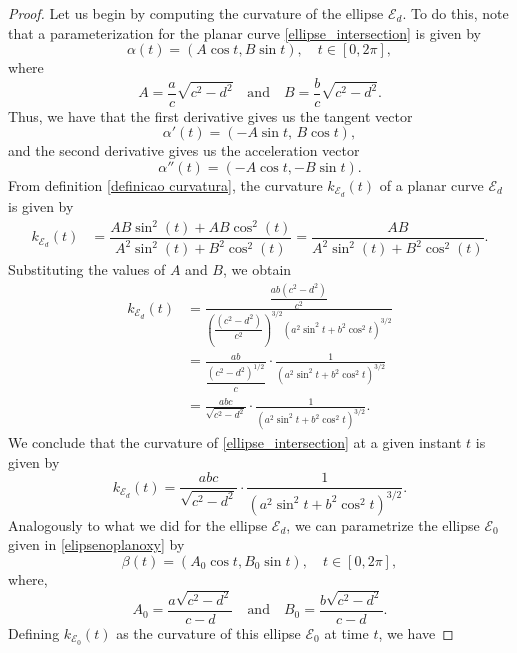 \documentclass[10pt,a4paper]{amsart}
\begin{document}
\begin{proof}
	Let us begin by computing the curvature of the ellipse \( \mathcal{E}_d \). To do this, note that a parameterization for the planar curve  \eqref{ellipse_intersection} is given by
	\begin{equation}\label{parametriza elipse ed}
		\alpha(t) = (A \cos t, B \sin t), \quad t \in [0,2\pi],
	\end{equation}
	where
	$$
	A = \dfrac{a}{c}\sqrt{c^2 - d^2} \quad \text{and} \quad B = \dfrac{b}{c}\sqrt{c^2 - d^2}.
	$$
	Thus, we have that the first derivative gives us the tangent vector
	$$
	\alpha'(t) = (-A \sin t,\, B \cos t),
	$$
	and the second derivative gives us the acceleration vector
	$$
	\alpha''(t) = (-A \cos t, -B \sin t).
	$$
	From definition \ref{definicao curvatura}, the curvature $k_{\mathcal{E}_d}(t)$ of a planar curve $\mathcal{E}_d$ is given by
	\begin{align*}
		k_{\mathcal{E}_d}(t) & = \dfrac{AB \sin^2(t) + AB \cos^2(t)}{A^2 \sin^2(t) + B^2 \cos^2(t)}  = \dfrac{AB}{A^2 \sin^2(t) + B^2 \cos^2(t)}.
	\end{align*}
	Substituting the values of $A$ and $B$, we obtain
	\begin{align*}
		k_{\mathcal{E}_d}(t) &= \frac{\dfrac{ab(c^2 - d^2)}{c^2}}{\left( \dfrac{(c^2 - d^2)}{c^2} \right)^{3/2} (a^2 \sin^2 t + b^2 \cos^2 t)^{3/2}} \\
		&= \frac{ab}{\dfrac{(c^2 - d^2)^{1/2}}{c}} \cdot \frac{1}{(a^2 \sin^2 t + b^2 \cos^2 t)^{3/2}} \\
		&= \frac{abc}{\sqrt{c^2 - d^2}} \cdot \frac{1}{(a^2 \sin^2 t + b^2 \cos^2 t)^{3/2}}.
	\end{align*}
	We conclude that the curvature of \eqref{ellipse_intersection} at a given instant \( t \) is given by
	\begin{equation}\label{curvatura1}
		k_{\mathcal{E}_d}(t) = \frac{abc}{\sqrt{c^2 - d^2}} \cdot \frac{1}{(a^2 \sin^2 t + b^2 \cos^2 t)^{3/2}}.
	\end{equation}
	Analogously to what we did for the ellipse $\mathcal{E}_d$, we can parametrize the ellipse $\mathcal{E}_0$ given in \eqref{elipsenoplanoxy} by
	\begin{equation}\label{parametriza elipse e0}
		\beta(t) = (A_0 \cos t, B_0 \sin t), \quad t \in [0,2\pi],
	\end{equation}
	where,
	$$
	A_0 = \dfrac{a \sqrt{c^2 - d^2}}{c - d} \quad \text{and} \quad B_0 = \dfrac{b \sqrt{c^2 - d^2}}{c - d}.
	$$
	Defining $k_{\mathcal{E}_0}(t)$ as the curvature of this ellipse $\mathcal{E}_0$ at time $t$, we have

\end{proof}
\end{document}
